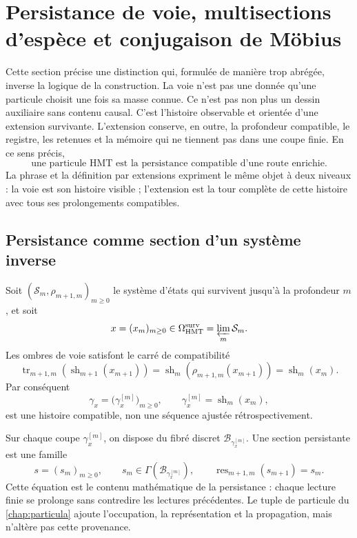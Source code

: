 \section{Persistance de voie, multisections d'espèce et conjugaison de Möbius}
\label{sec:persistencia-ruta-mobius-familias}

Cette section précise une distinction qui, formulée de manière trop
abrégée, inverse la logique de la construction. La voie n'est pas une donnée qu'une
particule choisit une fois sa masse connue. Ce n'est pas non plus un dessin auxiliaire
sans contenu causal. C'est l'histoire observable et orientée d'une extension
survivante. L'extension conserve, en outre, la profondeur compatible, le
registre, les retenues et la mémoire qui ne tiennent pas dans une coupe finie. En ce
sens précis,
\[
 \boxed{\text{une particule HMT est la persistance compatible d'une route
 enrichie}.}
\]
La phrase et la définition par extensions expriment le même objet à deux
niveaux : la voie est son histoire visible ; l'extension est la tour complète de
cette histoire avec tous ses prolongements compatibles.

\subsection{Persistance comme section d'un système inverse}

Soit \((\mathcal S_m,\rho_{m+1,m})_{m\geq0}\) le système d'états qui
survivent jusqu'à la profondeur \(m\), et soit
\[
 x=(x_m)_{m\geq0}\in\Omega_{\rm HMT}^{\rm surv}
 =\varprojlim_m\mathcal S_m.
\]
Les ombres de voie satisfont le carré de compatibilité
\[
 \operatorname{tr}_{m+1,m}\!\left(\operatorname{sh}_{m+1}(x_{m+1})\right)
 =\operatorname{sh}_{m}\!\left(\rho_{m+1,m}(x_{m+1})\right)
 =\operatorname{sh}_{m}(x_m).
\]
Par conséquent
\[
 \gamma_x=\bigl(\gamma_x^{[m]}\bigr)_{m\geq0},
 \qquad \gamma_x^{[m]}=\operatorname{sh}_m(x_m),
\]
est une histoire compatible, non une séquence ajustée rétrospectivement.

Sur chaque coupe \(\gamma_x^{[m]}\), on dispose du fibré discret
\(\mathcal B_{\gamma_x^{[m]}}\). Une section persistante est une famille
\[
 s=(s_m)_{m\geq0},
 \qquad
 s_m\in\Gamma\!\left(\mathcal B_{\gamma_x^{[m]}}\right),
 \qquad
 \operatorname{res}_{m+1,m}(s_{m+1})=s_m.
\]
Cette équation est le contenu mathématique de la persistance : chaque lecture
finie se prolonge sans contredire les lectures précédentes. Le tuple de
particule du \cref{chap:particula} ajoute l'occupation,
la représentation et la propagation, mais n'altère pas cette provenance.

